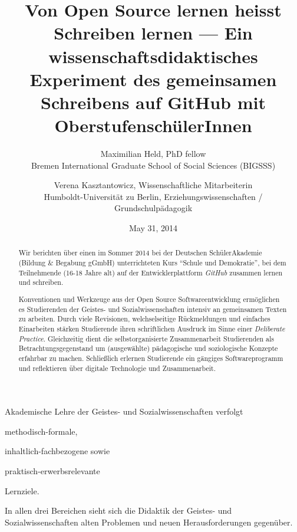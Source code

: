 \documentclass[11pt,a4paper,oneside]{article}
\title{
	Von Open Source lernen heisst Schreiben lernen ---
	Ein wissenschaftsdidaktisches Experiment des gemeinsamen Schreibens auf GitHub mit OberstufenschülerInnen
}
\date{May 31, 2014}
\author{
	Maximilian Held, PhD fellow\\
	Bremen International Graduate School of Social Sciences (BIGSSS)
	\and
	Verena Kasztantowicz, Wissenschaftliche Mitarbeiterin\\
	Humboldt-Universität zu Berlin, Erziehungswissenschaften / Grundschulpädagogik
}
\begin{document}
\maketitle

\begin{abstract}
	Wir berichten über einen im Sommer 2014 bei der Deutschen SchülerAkademie (Bildung \& Begabung gGmbH) unterrichteten Kurs ``Schule und Demokratie'', bei dem Teilnehmende (16-18 Jahre alt) auf der Entwicklerplattform \emph{GitHub} zusammen lernen und schreiben.

	Konventionen und Werkzeuge aus der Open Source Softwareentwicklung ermöglichen es Studierenden der Geistes- und Sozialwissenschaften intensiv an gemeinsamen Texten zu arbeiten.
	Durch viele Revisionen, welchselseitige Rückmeldungen und einfaches Einarbeiten stärken Studierende ihren schriftlichen Ausdruck im Sinne einer \emph{Deliberate Practice}.
	Gleichzeitig dient die selbstorganisierte Zusammenarbeit Studierenden als Betrachtungsgegenstand um (ausgewählte) pädagogische und soziologische Konzepte erfahrbar zu machen.
	Schließlich erlernen Studierende ein gängiges Softwareprogramm und reflektieren über digitale Technologie und Zusammenarbeit.
\end{abstract}


Akademische Lehre der Geistes- und Sozialwissenschaften verfolgt
\begin{inparaenum}
	\item methodisch-formale,
	\item inhaltlich-fachbezogene sowie
	\item praktisch-erwerbsrelevante
\end{inparaenum}
Lernziele.

In allen drei Bereichen sieht sich die Didaktik der Geistes- und Sozialwissenschaften alten Problemen und neuen Herausforderungen gegenüber.
\end{document}
